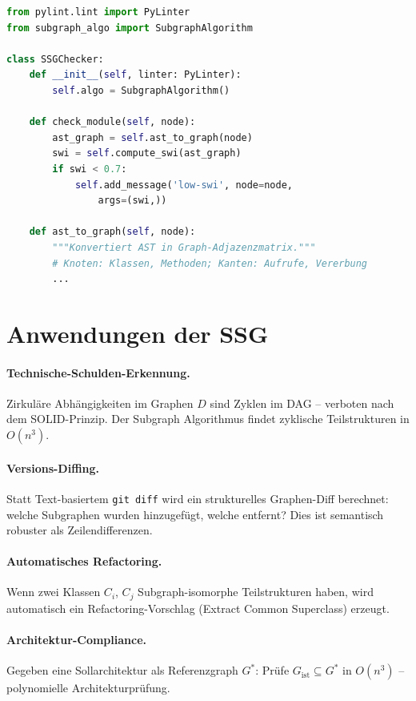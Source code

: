 ﻿\documentclass[a4paper,12pt]{scrreprt}
\theoremstyle{definition}
\begin{document}
\begin{lstlisting}[language=Python,caption={SSG als Pylint-Plugin}]
from pylint.lint import PyLinter
from subgraph_algo import SubgraphAlgorithm

class SSGChecker:
    def __init__(self, linter: PyLinter):
        self.algo = SubgraphAlgorithm()

    def check_module(self, node):
        ast_graph = self.ast_to_graph(node)
        swi = self.compute_swi(ast_graph)
        if swi < 0.7:
            self.add_message('low-swi', node=node,
                args=(swi,))

    def ast_to_graph(self, node):
        """Konvertiert AST in Graph-Adjazenzmatrix."""
        # Knoten: Klassen, Methoden; Kanten: Aufrufe, Vererbung
        ...
\end{lstlisting}

\section{Anwendungen der SSG}

\paragraph{Technische-Schulden-Erkennung.} Zirkuläre Abhängigkeiten im
Graphen $D$ sind Zyklen im DAG -- verboten nach dem SOLID-Prinzip.
Der Subgraph Algorithmus findet zyklische Teilstrukturen in $O(n^3)$.

\paragraph{Versions-Diffing.} Statt Text-basiertem \texttt{git diff} wird
ein strukturelles Graphen-Diff berechnet: welche Subgraphen wurden
hinzugefügt, welche entfernt? Dies ist semantisch robuster als
Zeilendifferenzen.

\paragraph{Automatisches Refactoring.} Wenn zwei Klassen $C_i$, $C_j$
Subgraph-isomorphe Teilstrukturen haben, wird automatisch ein
Refactoring-Vorschlag (Extract Common Superclass) erzeugt.

\paragraph{Architektur-Compliance.} Gegeben eine Sollarchitektur als
Referenzgraph $G^*$: Prüfe $G_{\mathrm{ist}} \subseteq G^*$ in $O(n^3)$
-- polynomielle Architekturprüfung.
\end{document}
